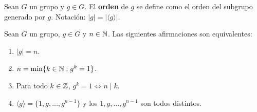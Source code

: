 \begin{definition}
	Sean $G$ un grupo y $g\in G$. El \textbf{orden} de $g$ 
	se define como el orden del subgrupo generado por $g$. Notación: 
	$|g|=|\langle g\rangle|$.
\end{definition}

\begin{theorem}
	Sean $G$ un grupo, $g\in G$ y $n\in\mathbb{N}$. Las siguientes afirmaciones son
	equivalentes:
	\begin{enumerate}
		\item $|g|=n$.
		\item $n=\min\{k\in\mathbb{N}:g^k=1\}$.
		\item Para todo $k\in\mathbb{Z}$, $g^k=1\Longleftrightarrow n\mid k$.
		\item $\langle g\rangle=\{1,g,\dots,g^{n-1}\}$ y los
			$1,g,\dots,g^{n-1}$ son todos distintos.
	\end{enumerate}
\end{theorem}

